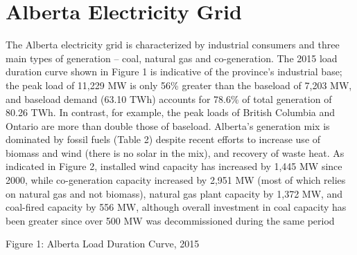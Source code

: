 \section{Alberta Electricity Grid}
\label{sec:AlbertaElectricityGrid}

The Alberta electricity grid is characterized by industrial consumers and three main types of generation – coal, natural gas and co-generation. The 2015 load duration curve shown in Figure 1 is indicative of the province’s industrial base; the peak load of 11,229 MW is only 56\% greater than the baseload of 7,203 MW, and baseload demand (63.10 TWh) accounts for 78.6\% of total generation of 80.26 TWh. In contrast, for example, the peak loads of British Columbia and Ontario are more than double those of baseload. Alberta’s generation mix is dominated by fossil fuels (Table 2) despite recent efforts to increase use of biomass and wind (there is no solar in the mix), and recovery of waste heat. As indicated in Figure 2, installed wind capacity has increased by 1,445 MW since 2000, while co-generation capacity increased by 2,951 MW (most of which relies on natural gas and not biomass), natural gas plant capacity by 1,372 MW, and coal-fired capacity by 556 MW, although overall investment in coal capacity has been greater since over 500 MW was decommissioned during the same period
 
 
 
Figure 1: Alberta Load Duration Curve, 2015



